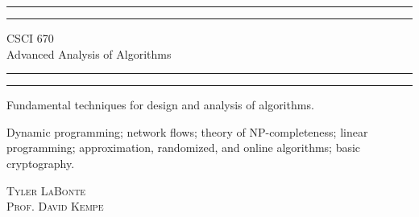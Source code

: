 \begin{titlepage} %

	\centering %
	
	\scshape %
	
	
	\rule{\textwidth}{1.6pt}\vspace*{-\baselineskip}\vspace*{2pt} %
	\rule{\textwidth}{0.4pt} %
	
	\vspace{0.75\baselineskip} %
	
	{\LARGE CSCI 670\\} %
    {\LARGE Advanced Analysis of Algorithms\\} %
	
	\vspace{0.75\baselineskip} %
	
	\rule{\textwidth}{0.4pt}\vspace*{-\baselineskip}\vspace{3.2pt} %
	\rule{\textwidth}{1.6pt} %
	
	\vspace{2\baselineskip} %
	
	
	Fundamental techniques for design and analysis of algorithms.
    
    \vspace*{\baselineskip} %
    
    Dynamic programming; network flows; theory of NP-completeness; linear programming; approximation, randomized, and online algorithms; basic cryptography.
	
	\vspace*{2\baselineskip} %
	
	
	{\scshape\Large Tyler LaBonte \\ Prof. David Kempe \\} %
	

\end{titlepage}
